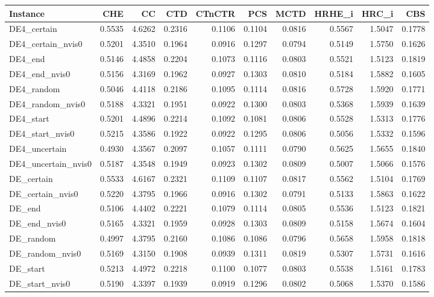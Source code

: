 \begin{tabular}{lrrrrrrrrr}
\toprule
Instance & CHE & CC & CTD & CTnCTR & PCS & MCTD & HRHE_i & HRC_i & CBS \\
\midrule
DE4_certain & 0.5535 & 4.6262 & 0.2316 & 0.1106 & 0.1104 & 0.0816 & 0.5567 & 1.5047 & 0.1778 \\
DE4_certain_nvis0 & 0.5201 & 4.3510 & 0.1964 & 0.0916 & 0.1297 & 0.0794 & 0.5149 & 1.5750 & 0.1626 \\
DE4_end & 0.5146 & 4.4858 & 0.2204 & 0.1073 & 0.1116 & 0.0803 & 0.5521 & 1.5123 & 0.1819 \\
DE4_end_nvis0 & 0.5156 & 4.3169 & 0.1962 & 0.0927 & 0.1303 & 0.0810 & 0.5184 & 1.5882 & 0.1605 \\
DE4_random & 0.5046 & 4.4118 & 0.2186 & 0.1095 & 0.1114 & 0.0816 & 0.5728 & 1.5920 & 0.1771 \\
DE4_random_nvis0 & 0.5188 & 4.3321 & 0.1951 & 0.0922 & 0.1300 & 0.0803 & 0.5368 & 1.5939 & 0.1639 \\
DE4_start & 0.5201 & 4.4896 & 0.2214 & 0.1092 & 0.1081 & 0.0806 & 0.5528 & 1.5313 & 0.1776 \\
DE4_start_nvis0 & 0.5215 & 4.3586 & 0.1922 & 0.0922 & 0.1295 & 0.0806 & 0.5056 & 1.5332 & 0.1596 \\
DE4_uncertain & 0.4930 & 4.3567 & 0.2097 & 0.1057 & 0.1111 & 0.0790 & 0.5625 & 1.5655 & 0.1840 \\
DE4_uncertain_nvis0 & 0.5187 & 4.3548 & 0.1949 & 0.0923 & 0.1302 & 0.0809 & 0.5007 & 1.5066 & 0.1576 \\
DE_certain & 0.5533 & 4.6167 & 0.2321 & 0.1109 & 0.1107 & 0.0817 & 0.5562 & 1.5104 & 0.1769 \\
DE_certain_nvis0 & 0.5220 & 4.3795 & 0.1966 & 0.0916 & 0.1302 & 0.0791 & 0.5133 & 1.5863 & 0.1622 \\
DE_end & 0.5106 & 4.4402 & 0.2221 & 0.1079 & 0.1114 & 0.0805 & 0.5536 & 1.5123 & 0.1821 \\
DE_end_nvis0 & 0.5165 & 4.3321 & 0.1959 & 0.0928 & 0.1303 & 0.0809 & 0.5158 & 1.5674 & 0.1604 \\
DE_random & 0.4997 & 4.3795 & 0.2160 & 0.1086 & 0.1086 & 0.0796 & 0.5658 & 1.5958 & 0.1818 \\
DE_random_nvis0 & 0.5169 & 4.3150 & 0.1908 & 0.0939 & 0.1311 & 0.0819 & 0.5307 & 1.5731 & 0.1616 \\
DE_start & 0.5213 & 4.4972 & 0.2218 & 0.1100 & 0.1077 & 0.0803 & 0.5538 & 1.5161 & 0.1783 \\
DE_start_nvis0 & 0.5190 & 4.3397 & 0.1939 & 0.0919 & 0.1296 & 0.0802 & 0.5068 & 1.5370 & 0.1586 \\

\end{tabular}
